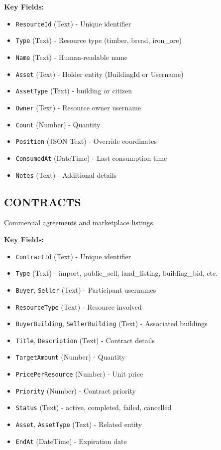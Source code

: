 \documentclass[11pt,a4paper]{article}
\begin{document}
\textbf{Key Fields:}
\begin{itemize}
\item \texttt{ResourceId} (Text) - Unique identifier
\item \texttt{Type} (Text) - Resource type (timber, bread, iron\_ore)
\item \texttt{Name} (Text) - Human-readable name
\item \texttt{Asset} (Text) - Holder entity (BuildingId or Username)
\item \texttt{AssetType} (Text) - building or citizen
\item \texttt{Owner} (Text) - Resource owner username
\item \texttt{Count} (Number) - Quantity
\item \texttt{Position} (JSON Text) - Override coordinates
\item \texttt{ConsumedAt} (DateTime) - Last consumption time
\item \texttt{Notes} (Text) - Additional details
\end{itemize}

\subsection{CONTRACTS}

Commercial agreements and marketplace listings.

\textbf{Key Fields:}
\begin{itemize}
\item \texttt{ContractId} (Text) - Unique identifier
\item \texttt{Type} (Text) - import, public\_sell, land\_listing, building\_bid, etc.
\item \texttt{Buyer}, \texttt{Seller} (Text) - Participant usernames
\item \texttt{ResourceType} (Text) - Resource involved
\item \texttt{BuyerBuilding}, \texttt{SellerBuilding} (Text) - Associated buildings
\item \texttt{Title}, \texttt{Description} (Text) - Contract details
\item \texttt{TargetAmount} (Number) - Quantity
\item \texttt{PricePerResource} (Number) - Unit price
\item \texttt{Priority} (Number) - Contract priority
\item \texttt{Status} (Text) - active, completed, failed, cancelled
\item \texttt{Asset}, \texttt{AssetType} (Text) - Related entity
\item \texttt{EndAt} (DateTime) - Expiration date
\end{itemize}
\end{document}
